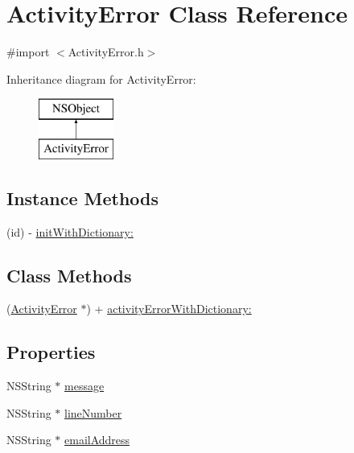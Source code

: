 \hypertarget{interface_activity_error}{\section{Activity\-Error Class Reference}
\label{interface_activity_error}
}


{\ttfamily \#import $<$Activity\-Error.\-h$>$}

Inheritance diagram for Activity\-Error\-:\begin{figure}[H]
\begin{center}
\leavevmode
\includegraphics[height=2.000000cm]{interface_activity_error}
\end{center}
\end{figure}
\subsection*{Instance Methods}
\begin{DoxyCompactItemize}
\item 
(id) -\/ \hyperlink{interface_activity_error_a68592793502af93d00c0cfddb15c8eb7}{init\-With\-Dictionary\-:}
\end{DoxyCompactItemize}
\subsection*{Class Methods}
\begin{DoxyCompactItemize}
\item 
(\hyperlink{interface_activity_error}{Activity\-Error} $\ast$) + \hyperlink{interface_activity_error_ac3a9f09e98c7a5ff9e195b8fa68c8817}{activity\-Error\-With\-Dictionary\-:}
\end{DoxyCompactItemize}
\subsection*{Properties}
\begin{DoxyCompactItemize}
\item 
N\-S\-String $\ast$ \hyperlink{interface_activity_error_a77ba32bbb23300ae5b6fdf6f88b75826}{message}
\item 
N\-S\-String $\ast$ \hyperlink{interface_activity_error_a1e98d11d46b4e2c1693be54a9573d915}{line\-Number}
\item 
N\-S\-String $\ast$ \hyperlink{interface_activity_error_ab78c5329eb797a57cfca8b2003703467}{email\-Address}
\end{DoxyCompactItemize}


